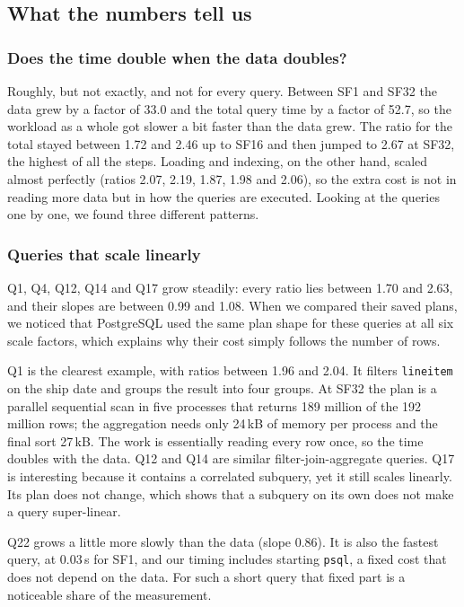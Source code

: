 \documentclass[11pt,a4paper]{article}
\newcommand{\file}[1]{\texttt{#1}}
\begin{document}
\subsection{What the numbers tell us}

\subsubsection*{Does the time double when the data doubles?}

Roughly, but not exactly, and not for every query. Between SF1 and SF32 the
data grew by a factor of 33.0 and the total query time by a factor of 52.7,
so the workload as a whole got slower a bit faster than the data grew. The
ratio for the total stayed between 1.72 and 2.46 up to SF16 and then jumped
to 2.67 at SF32, the highest of all the steps. Loading and indexing, on the
other hand, scaled almost perfectly (ratios 2.07, 2.19, 1.87, 1.98 and 2.06),
so the extra cost is not in reading more data but in how the queries are
executed. Looking at the queries one by one, we found three different
patterns.

\subsubsection*{Queries that scale linearly}

Q1, Q4, Q12, Q14 and Q17 grow steadily: every ratio lies between 1.70 and
2.63, and their slopes are between 0.99 and 1.08. When we compared their saved
plans, we noticed that PostgreSQL used the same plan shape for these queries
at all six scale factors, which explains why their cost simply follows the
number of rows.

Q1 is the clearest example, with ratios between 1.96 and 2.04. It filters
\file{lineitem} on the ship date and groups the result into four groups. At
SF32 the plan is a parallel sequential scan in five processes that returns
189 million of the 192 million rows; the aggregation needs only 24\,kB of
memory per process and the final sort 27\,kB. The work is essentially reading
every row once, so the time doubles with the data. Q12 and Q14 are similar
filter-join-aggregate queries. Q17 is interesting because it contains a
correlated subquery, yet it still scales linearly. Its plan does not change,
which shows that a subquery on its own does not make a query super-linear.

Q22 grows a little more slowly than the data (slope 0.86). It is also the
fastest query, at 0.03\,s for SF1, and our timing includes starting
\file{psql}, a fixed cost that does not depend on the data. For such a short
query that fixed part is a noticeable share of the measurement.
\end{document}
